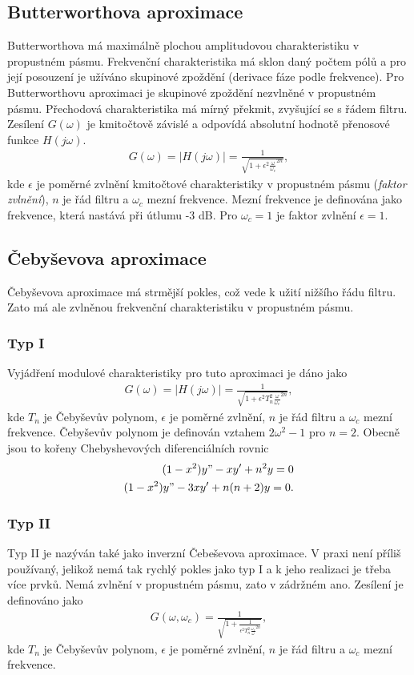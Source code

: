 \documentclass[twoside]{article}
\begin{document}
\subsection{Butterworthova aproximace}
Butterworthova má maximálně plochou amplitudovou charakteristiku v propustném pásmu. Frekvenční charakteristika má sklon daný počtem pólů a pro její posouzení je užíváno skupinové zpoždění (derivace fáze podle frekvence). Pro Butterworthovu aproximaci je skupinové zpoždění nezvlněné v propustném pásmu. Přechodová charakteristika má mírný překmit, zvyšující se s řádem filtru. Zesílení $G(\omega)$ je kmitočtově závislé a odpovídá absolutní hodnotě přenosové funkce $H(j\omega)$.
\begin{align*}
G(\omega) = |H(j\omega)| = \frac{1}{\sqrt{1 + \epsilon ^2 \frac{\omega}{\omega _c}^{2n}}},
\end{align*}
kde $\epsilon$ je poměrné zvlnění kmitočtové charakteristiky v propustném pásmu (\textit{faktor zvlnění}), $n$ je řád filtru a $\omega _c$ mezní frekvence. Mezní frekvence je definována jako frekvence, která nastává při útlumu -3 dB. Pro $\omega _c = 1$ je faktor zvlnění $\epsilon = 1$. 
\subsection{Čebyševova aproximace}
Čebyševova aproximace má strmější pokles, což vede k užití nižšího řádu filtru. Zato má ale zvlněnou frekvenční charakteristiku v propustném pásmu. 
\subsubsection{Typ I}
Vyjádření modulové charakteristiky pro tuto aproximaci je dáno jako
\begin{align}
G(\omega) = |H(j\omega)| = \frac{1}{\sqrt{1 + \epsilon ^2 T_n ^2 \frac{\omega}{\omega _c}^{2n}}},
\end{align}
kde $T_n$ je Čebyševův polynom, $\epsilon$ je poměrné zvlnění, $n$ je řád filtru a $\omega _c$ mezní frekvence. Čebyševův polynom je definován vztahem $2 \omega ^2 - 1$ pro $n = 2$. Obecně jsou to kořeny Chebyshevových diferenciálních rovnic
\begin{align}
(1 - x^2)y" - xy' + n^2y = 0\\
(1 - x^2)y" - 3xy' + n(n+2)y = 0.
\end{align}
\subsubsection{Typ II}
Typ II je nazýván také jako inverzní Čebeševova aproximace. V praxi není příliš používaný, jelikož nemá tak rychlý pokles jako typ I a k jeho realizaci je třeba více prvků. Nemá zvlnění v propustném pásmu, zato v zádržném ano. Zesílení je definováno jako
\begin{align}
G(\omega, \omega _c) = \frac{1}{\sqrt{1 + \frac{1}{\epsilon ^2 T_n ^2 \frac{\omega _c}{\omega}^{2n}}}},
\end{align}
kde $T_n$ je Čebyševův polynom, $\epsilon$ je poměrné zvlnění, $n$ je řád filtru a $\omega _c$ mezní frekvence.
\end{document}
